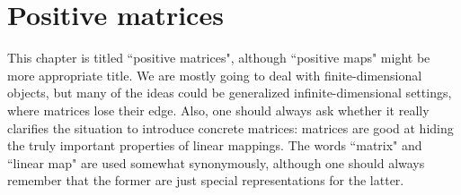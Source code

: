 \chapter{Positive matrices}

This chapter is titled ``positive matrices", although ``positive maps" might be more appropriate title. We are mostly going to deal with finite-dimensional objects, but many of the ideas could be generalized infinite-dimensional settings, where matrices lose their edge. Also, one should always ask whether it really clarifies the situation to introduce concrete matrices: matrices are good at hiding the truly important properties of linear mappings. The words ``matrix" and ``linear map" are used somewhat synonymously, although one should always remember that the former are just special representations for the latter.

